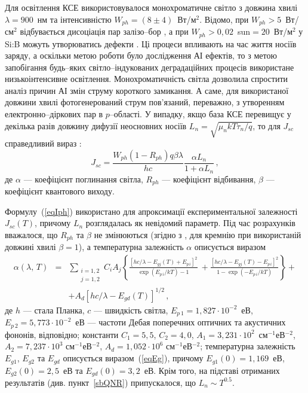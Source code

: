 Для освітлення КСЕ використовувалося монохроматичне світло з довжина хвилі $\lambda=900$~нм та інтенсивністю $W_{ph}=(8\pm4)$~Вт/м$^2$.
Відомо, при $W_{ph}>5$~Вт/см$^2$ відбувається дисоціація пар залізо--бор \cite{LID:CuII},
а при $W_{ph}>0,02$~sun$=20$~Вт/м$^2$
у Si:B можуть утворюватись дефекти \cite{BO:Halam2016}.
Ці процеси впливають на час життя носіїв заряду, а оскільки метою роботи було дослідження АІ ефектів,
то з метою запобігання будь--яких світло--індукованих деградаційних процесів використане
низькоінтенсивне освітлення.
Монохроматичність світла дозволила спростити аналіз причин АІ змін струму короткого замикання.
А саме, для використаної довжини хвилі фотогенерований струм пов'язаний, переважно, з утворенням електронно--діркових пар в $p$--області.
У випадку, якщо база КСЕ перевищує у декілька разів довжину дифузії неосновних носіїв $L_n=\sqrt{\mu_nkT\tau_n/q}$, то
для $J_{sc}$ справедливий вираз \cite{Markvart,Razeghi,Faren}:
\begin{equation}
\label{eqIph}
J_{sc} = \frac{W_{ph}(1-R_{ph})q\beta\lambda}{hc}\frac{\alpha L_n}{1+ \alpha L_n}\,,
\end{equation}
де
$\alpha$ --- коефіцієнт поглинання світла,
$R_{ph}$ --- коефіцієнт відбивання,
$\beta$ --- коефіцієнт квантового виходу.

Формулу~(\ref{eqIph}) використано для апроксимації експериментальної залежності $J_{sc}(T)$,
причому $L_n$ розглядалась як невідомий параметр.
Під час розрахунків вважалося, що $R_{ph}$ та $\beta$ не змінюються (згідно з \cite{Gaman}, для кремнію
при використаній довжині хвилі $\beta=1$),
а температурна залежність $\alpha$ описується виразом \cite{Markvart,Si:Absorb}
\begin{eqnarray}
\label{eqAlpha}
\nonumber \alpha(\lambda,\,T)&=&\sum_{\substack{i=1,2\\j=1,2}}\!C_iA_j\left\{\frac{[hc/\lambda-E_{gj}(T)+E_{p\,i}]^2}{\exp(E_{p\,i}/kT)-1}\:+
\frac{[hc/\lambda-E_{gj}(T)-E_{p\,i}]^2}{1-\exp(-E_{p\,i}/kT)}\right\}+\\
&&+A_d\left[hc/\lambda-E_{gd}(T)\right]^{1/2}\,,
\end{eqnarray}
де
$h$ --- стала Планка,
$c$ --- швидкість світла,
$E_{p\,1}=1,827\cdot10^{-2}$~еВ,
$E_{p\,2}=5,773\cdot10^{-2}$~еВ --- частоти Дебая поперечних
оптичних та акустичних фононів, відповідно;
константи $C_1=5,5$,
$C_2=4,0$,
$A_1=3,231\cdot10^2$~см$^{-1}$еВ$^{-2}$,
$A_2=7,237\cdot10^3$ см$^{-1}$еВ$^{-2}$,
$A_d=1,052\cdot10^6$ см$^{-1}$еВ$^{-2}$;
температурна залежність $E_{g1}$, $E_{g2}$ та $E_{gd}$ описується виразом~(\ref{eqEg}),
причому $E_{g1}(0)=1,169$~еВ, $E_{g2}(0)=2,5$~еВ та $E_{gd}(0)=3,2$~еВ.
Крім того, на підставі отриманих результатів (див. пункт~\ref{sbQNR}) припускалося, що $L_n\sim T^{0.5}$.

